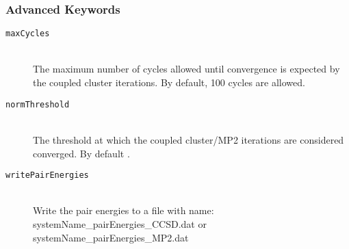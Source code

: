 \subsubsection{Advanced Keywords}
\begin{description}
    \item [\texttt{maxCycles}]\hfill \\
    The maximum number of cycles allowed until convergence is expected by the coupled cluster iterations.
    By default, 100 cycles are allowed.
    \item [\texttt{normThreshold}]\hfill \\
    The threshold at which the coupled cluster/MP2 iterations are considered converged. By default .
    \item [\texttt{writePairEnergies}]\hfill \\
    Write the pair energies to a file with name: systemName\_pairEnergies\_CCSD.dat or systemName\_pairEnergies\_MP2.dat
\end{description}